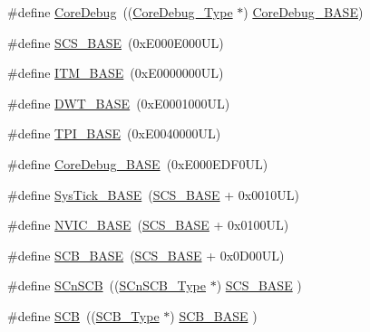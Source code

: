 \begin{DoxyCompactItemize}
\item 
\#define \mbox{\hyperlink{group___c_m_s_i_s__core__base_gab6e30a2b802d9021619dbb0be7f5d63d}{Core\+Debug}}~((\mbox{\hyperlink{struct_core_debug___type}{Core\+Debug\+\_\+\+Type}} $\ast$)     \mbox{\hyperlink{group___c_m_s_i_s__core__base_ga680604dbcda9e9b31a1639fcffe5230b}{Core\+Debug\+\_\+\+B\+A\+SE}})
\item 
\#define \mbox{\hyperlink{group___c_m_s_i_s__core__base_ga3c14ed93192c8d9143322bbf77ebf770}{S\+C\+S\+\_\+\+B\+A\+SE}}~(0x\+E000\+E000\+U\+L)
\item 
\#define \mbox{\hyperlink{group___c_m_s_i_s__core__base_gadd76251e412a195ec0a8f47227a8359e}{I\+T\+M\+\_\+\+B\+A\+SE}}~(0x\+E0000000\+U\+L)
\item 
\#define \mbox{\hyperlink{group___c_m_s_i_s__core__base_gafdab534f961bf8935eb456cb7700dcd2}{D\+W\+T\+\_\+\+B\+A\+SE}}~(0x\+E0001000\+U\+L)
\item 
\#define \mbox{\hyperlink{group___c_m_s_i_s__core__base_ga2b1eeff850a7e418844ca847145a1a68}{T\+P\+I\+\_\+\+B\+A\+SE}}~(0x\+E0040000\+U\+L)
\item 
\#define \mbox{\hyperlink{group___c_m_s_i_s__core__base_ga680604dbcda9e9b31a1639fcffe5230b}{Core\+Debug\+\_\+\+B\+A\+SE}}~(0x\+E000\+E\+D\+F0\+U\+L)
\item 
\#define \mbox{\hyperlink{group___c_m_s_i_s__core__base_ga58effaac0b93006b756d33209e814646}{Sys\+Tick\+\_\+\+B\+A\+SE}}~(\mbox{\hyperlink{group___c_m_s_i_s__core__base_ga3c14ed93192c8d9143322bbf77ebf770}{S\+C\+S\+\_\+\+B\+A\+SE}} +  0x0010\+U\+L)
\item 
\#define \mbox{\hyperlink{group___c_m_s_i_s__core__base_gaa0288691785a5f868238e0468b39523d}{N\+V\+I\+C\+\_\+\+B\+A\+SE}}~(\mbox{\hyperlink{group___c_m_s_i_s__core__base_ga3c14ed93192c8d9143322bbf77ebf770}{S\+C\+S\+\_\+\+B\+A\+SE}} +  0x0100\+U\+L)
\item 
\#define \mbox{\hyperlink{group___c_m_s_i_s__core__base_gad55a7ddb8d4b2398b0c1cfec76c0d9fd}{S\+C\+B\+\_\+\+B\+A\+SE}}~(\mbox{\hyperlink{group___c_m_s_i_s__core__base_ga3c14ed93192c8d9143322bbf77ebf770}{S\+C\+S\+\_\+\+B\+A\+SE}} +  0x0\+D00\+U\+L)
\item 
\#define \mbox{\hyperlink{group___c_m_s_i_s__core__base_ga9fe0cd2eef83a8adad94490d9ecca63f}{S\+Cn\+S\+CB}}~((\mbox{\hyperlink{struct_s_cn_s_c_b___type}{S\+Cn\+S\+C\+B\+\_\+\+Type}}    $\ast$)     \mbox{\hyperlink{group___c_m_s_i_s__core__base_ga3c14ed93192c8d9143322bbf77ebf770}{S\+C\+S\+\_\+\+B\+A\+SE}}         )
\item 
\#define \mbox{\hyperlink{group___c_m_s_i_s__core__base_gaaaf6477c2bde2f00f99e3c2fd1060b01}{S\+CB}}~((\mbox{\hyperlink{struct_s_c_b___type}{S\+C\+B\+\_\+\+Type}}       $\ast$)     \mbox{\hyperlink{group___c_m_s_i_s__core__base_gad55a7ddb8d4b2398b0c1cfec76c0d9fd}{S\+C\+B\+\_\+\+B\+A\+SE}}         )

\end{DoxyCompactItemize}
